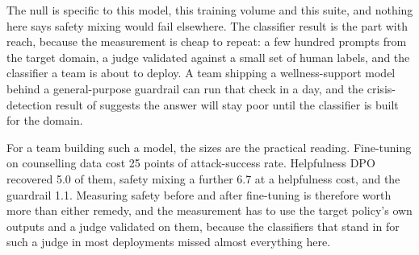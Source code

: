 \documentclass[10pt]{article} %
\begin{document}
The null is specific to this model, this training volume and this suite, and nothing here says safety mixing would fail elsewhere. The classifier result is the part with reach, because the measurement is cheap to repeat: a few hundred prompts from the target domain, a judge validated against a small set of human labels, and the classifier a team is about to deploy. A team shipping a wellness-support model behind a general-purpose guardrail can run that check in a day, and the crisis-detection result of \citet{nelson2026guardrail} suggests the answer will stay poor until the classifier is built for the domain.

For a team building such a model, the sizes are the practical reading. Fine-tuning on counselling data cost 25 points of attack-success rate. Helpfulness DPO recovered 5.0 of them, safety mixing a further 6.7 at a helpfulness cost, and the guardrail 1.1. Measuring safety before and after fine-tuning is therefore worth more than either remedy, and the measurement has to use the target policy's own outputs and a judge validated on them, because the classifiers that stand in for such a judge in most deployments missed almost everything here.
\end{document}
